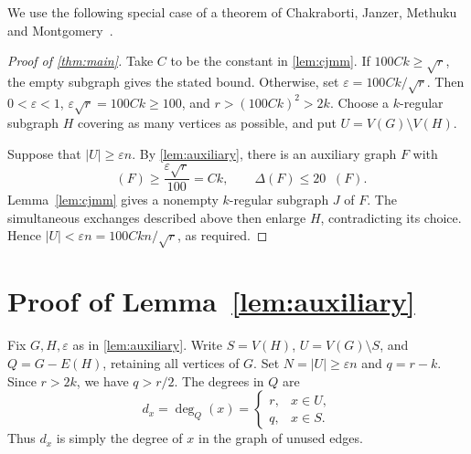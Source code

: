 \documentclass[11pt]{amsart}
\newtheorem{lemma}[theorem]{Lemma}
\theoremstyle{remark}
\DeclareMathOperator{\avdeg}{\overline d}
\begin{document}

We use the following special case of a theorem of Chakraborti, Janzer, Methuku and Montgomery~\cite[Theorem~1.13]{CJMM2026}.


\begin{proof}[Proof of \cref{thm:main}]
Take $C$ to be the constant in \cref{lem:cjmm}. If $100Ck\ge\sqrt r$, the empty subgraph gives the stated bound. Otherwise, set $\varepsilon=100Ck/\sqrt r$. Then $0<\varepsilon<1$, $\varepsilon\sqrt r=100Ck\ge100$, and $r>(100Ck)^2>2k$. Choose a $k$-regular subgraph $H$ covering as many vertices as possible, and put $U=V(G)\setminus V(H)$.

Suppose that $|U|\ge\varepsilon n$. By \cref{lem:auxiliary}, there is an auxiliary graph $F$ with
\[
\avdeg(F)\ge\frac{\varepsilon\sqrt r}{100}=Ck,
\qquad
\Delta(F)\le20\avdeg(F).
\]
Lemma~\ref{lem:cjmm} gives a nonempty $k$-regular subgraph $J$ of $F$. The simultaneous exchanges described above then enlarge $H$, contradicting its choice. Hence $|U|<\varepsilon n=100Ckn/\sqrt r$, as required.
\end{proof}

\section{Proof of Lemma~\ref{lem:auxiliary}}\label{sec:paths}

Fix $G,H,\varepsilon$ as in \cref{lem:auxiliary}. Write $S=V(H)$, $U=V(G)\setminus S$, and $Q=G-E(H)$, retaining all vertices of $G$. Set $N=|U|\ge\varepsilon n$ and $q=r-k$. Since $r>2k$, we have $q>r/2$. The degrees in $Q$ are
\[
d_x=\deg_Q(x)=
\begin{cases}
r,&x\in U,\\
q,&x\in S.
\end{cases}
\]
Thus $d_x$ is simply the degree of $x$ in the graph of unused edges.
\end{document}

